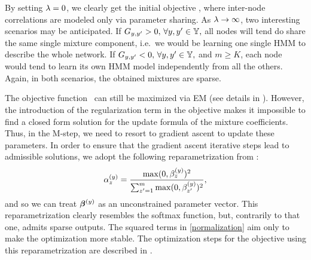 By setting $\lambda=0$, we clearly get the initial objective , where inter-node correlations are modeled only via parameter sharing. As $\lambda \to \infty$, two interesting scenarios may be anticipated. If ${G}_{y,y'} > 0, \, \forall y,y' \in {\mathbb{Y}},$ all nodes will tend do share the same single mixture component, i.e.\ we would be learning one single HMM to describe the whole network. If ${G}_{y,y'} < 0, \, \forall y,y' \in {\mathbb{Y}},$ and $m \geq K$, each node would tend to learn its own HMM model independently from all the others. Again, in both scenarios, the obtained mixtures are sparse.

The objective function~ can still be maximized via EM (see details in ). However, the introduction of the regularization term in the objective makes it impossible to find a closed form solution for the update formula of the mixture coefficients. Thus, in the M-step, we need to resort to gradient ascent to update these parameters. In order to ensure that the gradient ascent iterative steps lead to admissible solutions, we adopt the following reparametrization from \citet{Yang2018}:
\begin{equation}
\label{normalization}
{\alpha}^{(y)}_{z} = \frac{\max(0, {\beta^{(y)}_z})^2}{\sum_{z'=1}^m \max(0, {\beta^{(y)}_{z'}})^2}, 
\end{equation}
and so we can treat ${\bm{\beta}}^{(y)}$ as an unconstrained parameter vector. This reparametrization clearly resembles the softmax function, but, contrarily to that one, admits sparse outputs. The squared terms in \eqref{normalization} aim only to make the optimization more stable. The optimization steps for the objective  using this reparametrization are described in .

